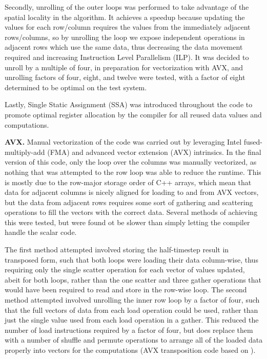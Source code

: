 \documentclass[letterpaper]{article}
\newcommand{\mypar}[1]{{\bf #1.}}
\begin{document}
Secondly, unrolling of the outer loops was performed to take advantage of the spatial locality in the algorithm. It achieves a speedup because updating the values for each row/column requires the values from the immediately adjacent rows/columns, so by unrolling the loop we expose independent operations in adjacent rows which use the same data, thus decreasing the data movement required and increasing Instruction Level Parallelism (ILP). It was decided to unroll by a multiple of four, in preparation for vectorization with AVX, and unrolling factors of four, eight, and twelve were tested, with a factor of eight determined to be optimal on the test system.

Lastly, Single Static Assignment (SSA) was introduced throughout the code to promote optimal register allocation by the compiler for all reused data values and computations.

\mypar{AVX}
Manual vectorization of the code was carried out by leveraging Intel fused-multiply-add (FMA) and advanced vector extension (AVX) intrinsics. In the final version of this code, only the loop over the columns was manually vectorized, as nothing that was attempted to the row loop was able to reduce the runtime. This is mostly due to the row-major storage order of C++ arrays, which mean that data for adjacent columns is nicely aligned for loading to and from AVX vectors, but the data from adjacent rows requires some sort of gathering and scattering operations to fill the vectors with the correct data. Several methods of achieving this were tested, but were found ot be slower than simply letting the compiler handle the scalar code.

The first method attempted involved storing the half-timestep result in transposed form, such that both loops were loading their data column-wise, thus requiring only the single scatter operation for each vector of values updated, abeit for both loops, rather than the one scatter and three gather operations that would have been required to read and store in the row-wise loop. The second method attempted involved unrolling the inner row loop by a factor of four, such that the full vectors of data from each load operation could be used, rather than just the single value used from each load operation in a gather. This reduced the number of load instructions required by a factor of four, but does replace them with a number of shuffle and permute operations to arrange all of the loaded data properly into vectors for the computations (AVX transposition code based on \cite{transpose}).
\end{document}
